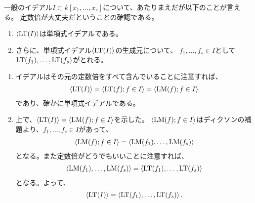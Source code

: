 一般のイデアル$I\subset k[x_1,\dots,x_s]$について、あたりまえだが以下のことが言える。
定数倍が大丈夫だということの確認である。
\begin{enumerate}
  \item $\left\langle {\rm LT}(I) \right\rangle$は単項式イデアルである。
  \item さらに、単項式イデアル$\left\langle {\rm LT}(I) \right\rangle$の生成元について、
  $f_1,\dots,f_s \in I$として${\rm LT}(f_1),\dots,{\rm LT}(f_s)$がとれる。
\end{enumerate}
\begin{myproof}
  \begin{enumerate}
    \item イデアルはその元の定数倍をすべて含んでいることに注意すれば、
    \begin{align}
      \left\langle {\rm LT}(I) \right\rangle = \left\langle {\rm LT}(f) ; f\in I \right\rangle = \left\langle {\rm LM}(f);f\in I \right\rangle
    \end{align}
    であり、確かに単項式イデアルである。
    \item 上で、$\left\langle {\rm LT}(I) \right\rangle = \left\langle {\rm LM}(f);f\in I \right\rangle$を示した。
    $\left\langle {\rm LM}(f);f\in I \right\rangle$はディクソンの補題より、$f_1,\dots,f_s \in I$があって、
    \begin{align}
      \left\langle {\rm LM}(f);f\in I \right\rangle = \left\langle {\rm LM}(f_1),\dots,{\rm LM}(f_s) \right\rangle
    \end{align}
    となる。また定数倍がどうでもいいことに注意すれば、
    \begin{align}
      \left\langle {\rm LM}(f_1),\dots,{\rm LM}(f_s) \right\rangle = \left\langle {\rm LT}(f_1),\dots,{\rm LT}(f_s) \right\rangle
    \end{align}
    となる。よって、
    \begin{align}
      \left\langle {\rm LT}(I) \right\rangle = \left\langle {\rm LT}(f_1),\dots,{\rm LT}(f_s) \right\rangle.
    \end{align}
  \end{enumerate}
\end{myproof}

